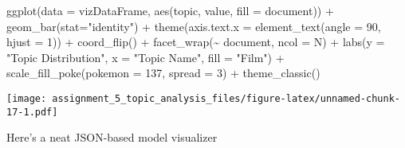 \documentclass[
]{article}
\newenvironment{Shaded}{\begin{snugshade}}{\end{snugshade}}
\newcommand{\AttributeTok}[1]{\textcolor[rgb]{0.77,0.63,0.00}{#1}}
\newcommand{\CommentTok}[1]{\textcolor[rgb]{0.56,0.35,0.01}{\textit{#1}}}
\newcommand{\ControlFlowTok}[1]{\textcolor[rgb]{0.13,0.29,0.53}{\textbf{#1}}}
\newcommand{\DecValTok}[1]{\textcolor[rgb]{0.00,0.00,0.81}{#1}}
\newcommand{\FunctionTok}[1]{\textcolor[rgb]{0.00,0.00,0.00}{#1}}
\newcommand{\NormalTok}[1]{#1}
\newcommand{\OtherTok}[1]{\textcolor[rgb]{0.56,0.35,0.01}{#1}}
\newcommand{\SpecialCharTok}[1]{\textcolor[rgb]{0.00,0.00,0.00}{#1}}
\newcommand{\StringTok}[1]{\textcolor[rgb]{0.31,0.60,0.02}{#1}}
\begin{document}
\begin{Shaded}
\begin{Highlighting}[]
\FunctionTok{ggplot}\NormalTok{(}\AttributeTok{data =}\NormalTok{ vizDataFrame, }\FunctionTok{aes}\NormalTok{(topic, value, }\AttributeTok{fill =}\NormalTok{ document)) }\SpecialCharTok{+}
  \FunctionTok{geom\_bar}\NormalTok{(}\AttributeTok{stat=}\StringTok{"identity"}\NormalTok{) }\SpecialCharTok{+}
  \FunctionTok{theme}\NormalTok{(}\AttributeTok{axis.text.x =} \FunctionTok{element\_text}\NormalTok{(}\AttributeTok{angle =} \DecValTok{90}\NormalTok{, }\AttributeTok{hjust =} \DecValTok{1}\NormalTok{)) }\SpecialCharTok{+}  
  \FunctionTok{coord\_flip}\NormalTok{() }\SpecialCharTok{+}
  \FunctionTok{facet\_wrap}\NormalTok{(}\SpecialCharTok{\textasciitilde{}}\NormalTok{ document, }\AttributeTok{ncol =}\NormalTok{ N) }\SpecialCharTok{+} 
  \FunctionTok{labs}\NormalTok{(}\AttributeTok{y =} \StringTok{"Topic Distribution"}\NormalTok{, }
       \AttributeTok{x =} \StringTok{"Topic Name"}\NormalTok{,}
       \AttributeTok{fill =} \StringTok{"Film"}\NormalTok{) }\SpecialCharTok{+} 
  \FunctionTok{scale\_fill\_poke}\NormalTok{(}\AttributeTok{pokemon =} \DecValTok{137}\NormalTok{, }\AttributeTok{spread =} \DecValTok{3}\NormalTok{) }\SpecialCharTok{+} 
  \FunctionTok{theme\_classic}\NormalTok{()}
\end{Highlighting}
\end{Shaded}

\texttt{[image: assignment\_5\_topic\_analysis\_files/figure-latex/unnamed-chunk-17-1.pdf]}

Here's a neat JSON-based model visualizer

\begin{Shaded}
\end{Shaded}
\end{document}

